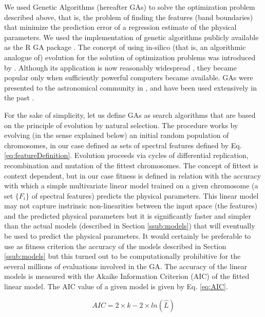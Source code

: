We used Genetic Algorithms (hereafter GAs) to solve the optimization
problem described above, that is, the problem of finding the features
(band boundaries) that minimize the prediction error of a regression
estimate of the physical parameters. We used the implementation of
genetic algorithms publicly available as the {\textsc R GA}
package \citep{JSSv053i04}. The concept of using in-silico (that is,
an algorithmic analogue of) evolution for the solution of optimization
problems was introduced by \cite{holland1975adaptation}. Although its
application is now reasonably widespread \citep[see
e.g.][]{goldberg1989genetic}, they became popular only when
sufficiently powerful computers became available. GAs were presented
to the astronomical community in \cite{1995ApJS..101..309C}, and have
been used extensively in the past \citep[see][for a significant
application of GAs in astronomy]{2013A&A...550A..74D}.

For the sake of simplicity, let us define GAs as search algorithms
that are based on the principle of evolution by natural
selection. The procedure works by evolving (in the sense
explained below) an initial random population of chromosomes, in our
case defined as sets of spectral features defined by
Eq. \ref{eq:featureDefinition}. Evolution proceeds via cycles of
differential replication, recombination and mutation of the fittest
chromosomes. The concept of fittest is context dependent, but in our
case fitness is defined in relation with the accuracy with which
a simple multivariate linear model trained on a given chromosome (a
set $\{F_i\}$ of spectral features) predicts the physical
parameters. This linear model may not capture instrinsic
non-linearities between the input space (the features) and the
predicted physical parameters but it is significantly faster and
simpler than the actual models (described in
Section \ref{ssub:models}) that will eventually be used to predict the
physical parameters. It would certainly be preferable to use as
fitness criterion the accuracy of the models described in
Section \ref{ssub:models} but this turned out to be computationally
prohibitive for the several millions of evaluations involved in the
GA. The accuracy of the linear models is measured with the Akaike
Information Criterion (AIC) of the fitted linear model.  The AIC value
of a given model is given by Eq. \ref{eq:AIC}.

\begin{equation}\label{eq:AIC}
  AIC = 2 \times k - 2 \times ln(\hat{L}) 
\end{equation}

